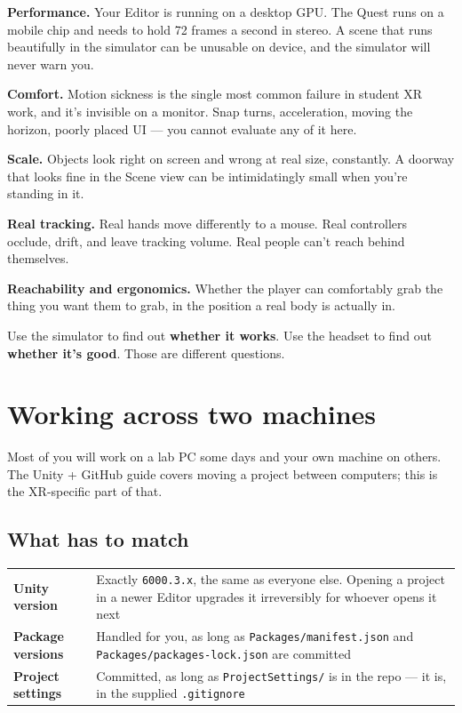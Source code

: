\documentclass[11pt,a4paper]{article}
\begin{document}
\textbf{Performance.} Your Editor is running on a desktop GPU. The Quest runs on a mobile chip
and needs to hold 72 frames a second in stereo. A scene that runs beautifully in the
simulator can be unusable on device, and the simulator will never warn you.

\textbf{Comfort.} Motion sickness is the single most common failure in student XR work, and
it's invisible on a monitor. Snap turns, acceleration, moving the horizon, poorly placed
UI --- you cannot evaluate any of it here.

\textbf{Scale.} Objects look right on screen and wrong at real size, constantly. A doorway that
looks fine in the Scene view can be intimidatingly small when you're standing in it.

\textbf{Real tracking.} Real hands move differently to a mouse. Real controllers occlude,
drift, and leave tracking volume. Real people can't reach behind themselves.

\textbf{Reachability and ergonomics.} Whether the player can comfortably grab the thing you
want them to grab, in the position a real body is actually in.

\begin{keybox}
Use the simulator to find out \textbf{whether it works}. Use the headset to find out
\textbf{whether it's good}. Those are different questions.
\end{keybox}


\section{Working across two machines}\label{working-across-two-machines}

Most of you will work on a lab PC some days and your own machine on others. The Unity +
GitHub guide covers moving a project between computers; this is the XR-specific part of
that.

\subsection{What has to match}\label{what-has-to-match}

\begin{longtable}[]{@{}
  >{\raggedright\arraybackslash}p{}
  >{\raggedright\arraybackslash}p{}@{}}
\toprule\noalign{}
\endhead
\bottomrule\noalign{}
\endlastfoot
\textbf{Unity version} & Exactly \texttt{6000.3.x}, the same as everyone else. Opening a project in a newer Editor upgrades it irreversibly for whoever opens it next \\
\textbf{Package versions} & Handled for you, as long as \texttt{Packages/manifest.json} and \texttt{Packages/packages-lock.json} are committed \\
\textbf{Project settings} & Committed, as long as \texttt{ProjectSettings/} is in the repo --- it is, in the supplied \texttt{.gitignore} \\
\end{longtable}
\end{document}
